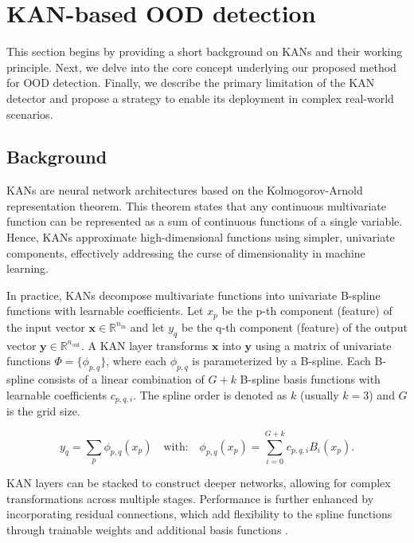 \section{KAN-based OOD detection}
This section begins by providing a short background on KANs and their working principle. 
Next, we delve into the core concept underlying our proposed method for OOD detection. 
Finally, we describe the primary limitation of the KAN detector and propose a strategy to enable its deployment in complex real-world scenarios.

\subsection{Background}
KANs are neural network architectures based on the Kolmogorov-Arnold representation theorem. 
This theorem states that any continuous multivariate function can be represented as a sum of continuous functions of a single variable. 
Hence, KANs approximate high-dimensional functions using simpler, univariate components, effectively addressing the curse of dimensionality in machine learning.

In practice, KANs decompose multivariate functions into univariate B-spline functions with learnable coefficients. 
Let $x_p$ be the p-th component (feature) of the input vector $\textbf{x} \in \mathbb{R}^{n_{\text{in}}}$ and let $y_q$ be the q-th component (feature) of the output vector $\textbf{y} \in \mathbb{R}^{n_{\text{out}}}$. 
A KAN layer transforms $\textbf{x}$ into $\textbf{y}$ using a matrix of univariate functions \(\Phi = \{ \phi_{p, q} \}\), where each \(\phi_{p, q}\) is parameterized by a B-spline.
Each B-spline consists of a linear combination of $G+k$ B-spline basis functions with learnable coefficients $c_{p, q, i}$. 
The spline order is denoted as $k$ (usually $k = 3$) and $G$ is the grid size.

\begin{equation}
\label{eq:spline}
   y_q = \sum_{p} \phi_{p, q}(x_p) \quad \textrm{with:} \quad \phi_{p, q}(x_p) = \sum_{i=0}^{G+k} c_{p, q, i} B_i(x_p). 
\end{equation}

KAN layers can be stacked to construct deeper networks, allowing for complex transformations across multiple stages. 
Performance is further enhanced by incorporating residual connections, which add flexibility to the spline functions through trainable weights and additional basis functions \citep{liu2024kankolmogorovarnoldnetworks}.

